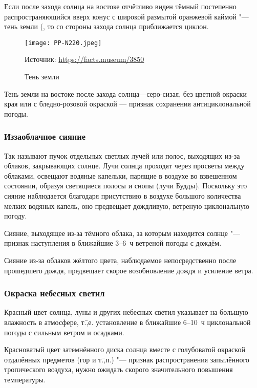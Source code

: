  Если после захода солнца на востоке отчётливо виден тёмный
постепенно распространяющийся вверх конус с широкой размытой оранжевой
каймой "--- тень земли (, то со стороны захода солнца
приближается циклон.

\begin{figure}[htb]
  \centering{}
  \texttt{[image: PP-N220.jpeg]}
  \caption{Тень земли}
  \label{fig:pp-n220}
  \scriptsize
  \centering{}Источник: \url{https://facts.museum/3850}
\end{figure}

 Тень земли на востоке после захода солнца—серо-сизая, без цветной
окраски края или с бледно-розовой окраской — признак сохранения
антициклональной погоды.

\subsubsection{Иззаоблачное сияние}

Так называют пучок отдельных светлых лучей или полос, выходящих из-за
облаков, закрывающих солнце. Лучи солнца проходят через просветы между
облаками, освещают водяные капельки, парящие в воздухе во взвешенном
состоянии, образуя светящиеся полосы и снопы (лучи Будды). Поскольку
это сияние наблюдается благодаря присутствию в воздухе большого
количества мелких водяных капель, оно предвещает дождливую, ветреную
циклональную погоду.

 Сияние, выходящее из-за тёмного облака, за которым находится
солнце "--- признак наступления в ближайшие 3--6~ч ветреной погоды с
дождём.

 Сияние из-за облаков жёлтого цвета, наблюдаемое
непосредственно после прошедшего дождя, предвещает скорое
возобновление дождя и усиление ветра.

\subsubsection{Окраска небесных светил}

 Красный цвет солнца, луны и других небесных светил указывает
на большую влажность в атмосфере, т.\=,е. установление в ближайшие
6--10~ч циклональной погоды с сильным ветром и осадками.

 Красноватый цвет затемнённого диска солнца вместе с
голубоватой окраской отдалённых предметов (гор и т.\=,п.) "--- признак
распространения запылённого тропического воздуха, нужно ожидать
скорого значительного повышения температуры.

